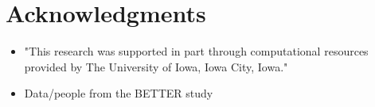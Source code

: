 \documentclass[10pt,letterpaper]{article}
\begin{document}




\section*{Acknowledgments}
\begin{itemize}
  \item "This research was supported in part through computational resources provided by The University of Iowa, Iowa City, Iowa."
  \item Data/people from the BETTER study 
\end{itemize}
\nolinenumbers
\end{document}
